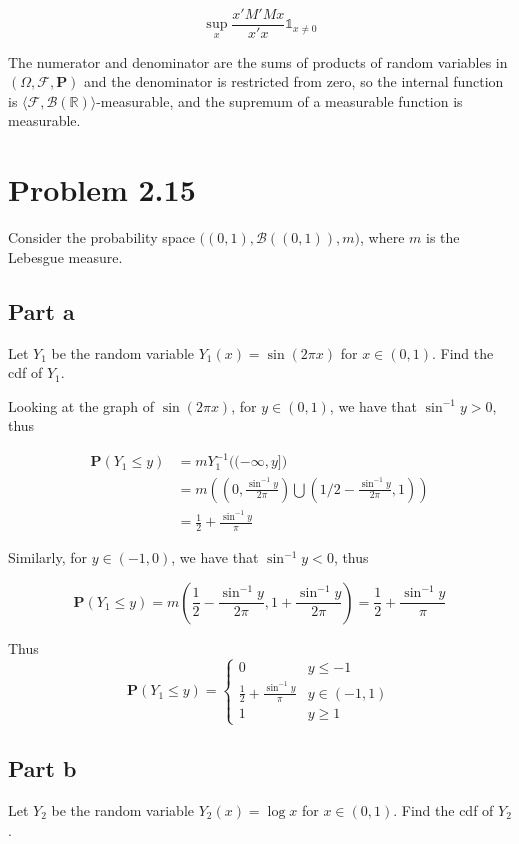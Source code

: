 \documentclass{article}
\newcommand{\R}{\mathbb{R}}
\newcommand{\F}{\mathcal{F}}
\newcommand{\B}{\mathcal{B}}
\newcommand{\prob}{\boldsymbol{P}}
\begin{document}
\[
\sup_{x} \frac{x'M'Mx}{x'x}\mathds{1}_{x \neq 0}
\]

The numerator and denominator are the sums of products of random variables in $(\Omega, \F, \prob)$ and the denominator is restricted from zero, so the internal function is $\langle \F, \B(\R) \rangle$-measurable, and the supremum of a measurable function is measurable.

\section*{Problem 2.15}

Consider the probability space $\bigl((0, 1), \B((0, 1)), m \bigl)$, where $m$ is the Lebesgue measure.

\subsection*{Part a}

Let $Y_1$ be the random variable $Y_1(x) = \sin(2\pi x)$ for $x \in (0, 1)$. Find the cdf of $Y_1$.

Looking at the graph of $\sin(2\pi x)$, for $y \in (0, 1)$, we have that $\sin^{-1} y > 0$, thus

\begin{align*}
\prob(Y_1 \leq y) &= mY_1^{-1}\bigl( (-\infty, y] \bigr)\\
&= m\left( \left(0, \frac{\sin^{-1}y}{2\pi}\right) \bigcup \left(1/2 - \frac{\sin^{-1}y}{2\pi}, 1\right)  \right)\\
&= \frac{1}{2} + \frac{\sin^{-1}y}{\pi}
\end{align*}

Similarly, for $y \in (-1, 0)$, we have that $\sin^{-1} y < 0$, thus

\[
\prob(Y_1 \leq y) = m\left( \frac{1}{2} - \frac{\sin^{-1}y}{2\pi}, 1 + \frac{\sin^{-1}y}{2\pi} \right) = \frac{1}{2} + \frac{\sin^{-1}y}{\pi}
\]

Thus
\[
\prob(Y_1 \leq y) =
\begin{cases}
0 & y \leq -1 \\
\frac{1}{2} + \frac{\sin^{-1}y}{\pi} & y \in (-1, 1) \\
1 & y \geq 1
\end{cases}
\]

\subsection*{Part b}

Let $Y_2$ be the random variable $Y_2(x) = \log x$ for $x \in (0, 1)$. Find the cdf of $Y_2$.
\end{document}
